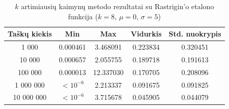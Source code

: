\begin{table}[H]
    \centering
    \begin{tabular}{|c|c|c|c|c|}
        \hline
        \textbf{Taškų kiekis} & \textbf{Min} & \textbf{Max} & \textbf{Vidurkis} & \textbf{Std. nuokrypis} \\ \hline
        1 000        & 0.000461 & 3.468091 & 0.223834 & 0.320451 \\ \hline
        10 000       & 0.000657 & 2.055755 & 0.189718 & 0.191613 \\ \hline
        100 000      & 0.000013 & 12.337030 & 0.170705 & 0.208096 \\ \hline
        1 000 000    & $<10^{-6}$ & 2.213337 & 0.091675 & 0.091825 \\ \hline
        10 000 000   & $<10^{-6}$ & 3.715678 & 0.045905 & 0.044079 \\ \hline
    \end{tabular}
    \caption{$k$ artimiausių kaimynų metodo rezultatai su Rastrigin'o etalono funkcija ($k = 8$, $\mu = 0$, $\sigma = 5$)}
\end{table}